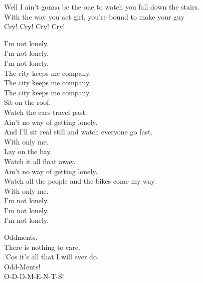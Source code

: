 Well I ain't gonna be the one to watch you fall down the stairs. \\
With the way you act girl, you're bound to make your guy \\
Cry! Cry! Cry! Cry! \\









I'm not lonely. \\
I'm not lonely. \\
I'm not lonely. \\
The city keeps me company. \\
The city keeps me company. \\
The city keeps me company. \\

Sit on the roof. \\
Watch the cars travel past. \\
Ain't no way of getting lonely. \\
And I'll sit real still and watch everyone go fast. \\
With only me. \\

Lay on the bay. \\
Watch it all float away. \\
Ain't no way of getting lonely. \\
Watch all the people and the bikes come my way. \\
With only me. \\

I'm not lonely. \\
I'm not lonely. \\
I'm not lonely. \\





Oddments. \\
There is nothing to care. \\
'Cos it's all that I will ever do. \\
Odd-Ments! \\

O-D-D-M-E-N-T-S! \\
